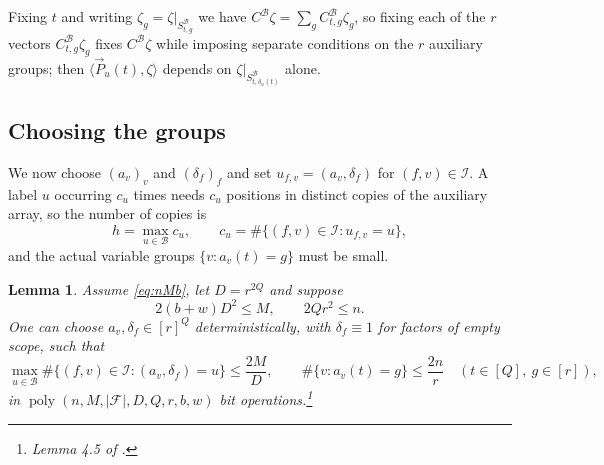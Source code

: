 \documentclass[11pt,reqno]{amsart}
\numberwithin{equation}{section}
\theoremstyle{plain}
\newtheorem{lemma}[theorem]{Lemma}
\theoremstyle{definition}
\theoremstyle{remark}
\DeclareMathOperator{\poly}{poly}
\newcommand{\F}{\mathcal{F}}
\newcommand{\B}{\mathcal{B}}
\newcommand{\PP}{\vec{P}}
\newcommand{\ip}[2]{\langle #1,#2\rangle}
\begin{document}
Fixing $t$ and writing $\zeta_g=\zeta|_{S^{\B}_{t,g}}$ we have
$C^{\B}\zeta=\sum_gC^{\B}_{t,g}\zeta_g$, so fixing each of the $r$ vectors
$C^{\B}_{t,g}\zeta_g$ fixes $C^{\B}\zeta$ while imposing separate conditions on
the $r$ auxiliary groups; then $\ip{\PP_u(t)}{\zeta}$ depends on
$\zeta|_{S^{\B}_{t,\delta_u(t)}}$ alone.

\subsection{Choosing the groups}
We now choose $(a_v)_v$ and $(\delta_f)_f$ and set $u_{f,v}=(a_v,\delta_f)$ for
$(f,v)\in\mathcal I$. A label $u$ occurring $c_u$ times needs $c_u$ positions in
distinct copies of the auxiliary array, so the number of copies is
\begin{equation}\label{eq:h}
  h=\max_{u\in\B}c_u,\qquad c_u=\#\{(f,v)\in\mathcal I:u_{f,v}=u\},
\end{equation}
and the actual variable groups $\{v:a_v(t)=g\}$ must be small.

\begin{lemma}\label{lem:labels}
Assume \eqref{eq:nMb}, let $D=r^{2Q}$ and suppose
\begin{equation}\label{eq:balance}
  2(b+w)D^2\le M,\qquad 2Qr^2\le n .
\end{equation}
One can choose $a_v,\delta_f\in[r]^{Q}$ deterministically, with
$\delta_f\equiv1$ for factors of empty scope, such that
\[
  \max_{u\in\B}\#\{(f,v)\in\mathcal I:(a_v,\delta_f)=u\}\le\frac{2M}D,\qquad
  \#\{v:a_v(t)=g\}\le\frac{2n}r\quad(t\in[Q],\ g\in[r]),
\]
in $\poly(n,M,|\F|,D,Q,r,b,w)$ bit operations.\footnote{Lemma 4.5 of \cite{OAI26}.}
\end{lemma}
\end{document}
